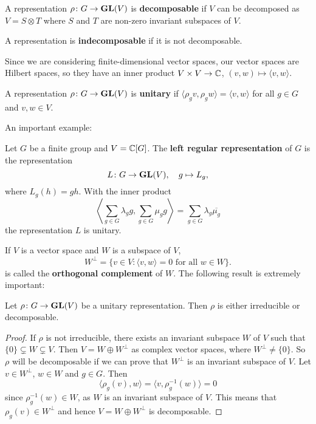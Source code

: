 \begin{definition}
A representation
$\rho\colon G\to\mathbf{GL}(V)$ is \textbf{decomposable} if $V$ can be decomposed as $V=S\otimes T$
where $S$ and $T$ are non-zero invariant subspaces of $V$. 
\end{definition}

A representation is 
\textbf{indecomposable} if it is not decomposable. 

\medskip
Since we are considering finite-dimensional vector spaces, our vector spaces are
Hilbert spaces, so they have
an inner product $V\times V\to\mathbb{C}$, $(v,w)\mapsto\langle v,w\rangle$.

\begin{definition}
    A representation $\rho\colon G\to\mathbf{GL}(V)$ is \textbf{unitary} if
    $\langle \rho_gv,\rho_gw\rangle=\langle v,w\rangle$ for all $g\in G$ and $v,w\in V$.
\end{definition}

An important example:

\begin{example}
Let $G$ be a finite group and $V=\mathbb{C}[G]$. The \textbf{left regular representation}
of $G$ is the representation
\[
L\colon G\to\mathbf{GL}(V),
\quad
g\mapsto L_g,
\]
where $L_g(h)=gh$. With the inner product
\[
\left\langle\sum_{g\in G}\lambda_gg,\sum_{g\in G}\mu_gg\right\rangle=\sum_{g\in G}\lambda_g\overline{\mu_g}
\]
the representation $L$ is unitary.
\end{example}



If $V$ is a vector space and $W$ is a subspace of $V$, 
\[
W^\perp = \{v\in V:\langle v,w\rangle=0\text{ for all $w\in W$}\}.
\]
is called the 
\textbf{orthogonal complement} of $W$. The following result is extremely important: 

\begin{proposition}
Let $\rho\colon G\to\mathbf{GL}(V)$ be a unitary representation. Then $\rho$ is either
irreducible or decomposable.
\end{proposition}

\begin{proof}
	If $\rho$ is not irreducible, there exists an invariant subspace $W$ of $V$ such that
	$\{0\}\subsetneq W\subsetneq V$. 
	Then $V=W\oplus W^{\perp}$ as complex vector spaces, where 
	$W^\perp\ne\{0\}$. So $\rho$ will be decomposable if we can prove that
	$W^\perp$ is an invariant subspace of $V$. 
	Let $v\in W^\perp$, $w\in W$ and $g\in G$. Then  
	\[
	\langle \rho_g(v),w\rangle=\langle v,\rho_g^{-1}(w)\rangle=0   
	\]
	since $\rho_g^{-1}(w)\in W$, as $W$ is an invariant subspace of $V$. This means that 
	$\rho_g(v)\in W^\perp$ and hence $V=W\oplus W^{\perp}$ is decomposable.  
\end{proof}

